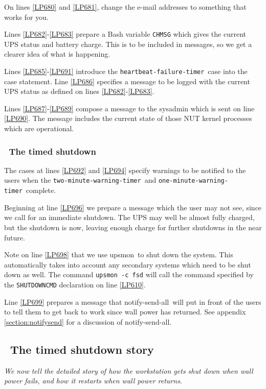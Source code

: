 \documentclass[12pt]{article}
\newlength{\headersep}\setlength{\headersep}{3mm}
\newcommand{\Hsep}{\hspace{\headersep}}
\newcommand{\newcolumn}{\vfill\eject}
\newcommand{\upsmon}{\mbox{\textcolor{MONCOLOUR}{upsmon}}}
\newcommand{\notifysendall}{\mbox{\textcolor{NOTIFYCOLOUR}{notify-send-all}}}
\newcommand{\twominwarntim}{\texttt{two-minute{\allowbreak}-warning{\allowbreak}-timer}}
\newcommand{\oneminwarntim}{\texttt{one-minute{\allowbreak}-warning{\allowbreak}-timer}}
\newcommand{\heartfailtimer}{\texttt{heartbeat{\allowbreak}-failure{\allowbreak}-timer}}
\begin{document}
On lines \ref{LP680} and \ref{LP681}, change the e-mail addresses to something
that works for you.

Lines \ref{LP682}-\ref{LP683} prepare a Bash variable \texttt{CHMSG} which
gives the current UPS status and battery charge.  This is to be included in
messages, so we get a clearer idea of what is happening.

Lines \ref{LP685}-\ref{LP691} introduce the \heartfailtimer\
case into the case statement.  Line \ref{LP686} specifies a message to be
logged with the current UPS status as defined on lines
\ref{LP682}-\ref{LP683}.  

Lines \ref{LP687}-\ref{LP689} compose a message to the sysadmin which is sent
on line \ref{LP690}.  The message includes the current state of those NUT
kernel processes which are operational.

\subsubsection{\Hsep\ The timed shutdown}\label{section:timedshutdown}

The cases at lines \ref{LP692} and \ref{LP694} specify warnings to be notified
to the users when the \twominwarntim\ and \oneminwarntim\ complete.

Beginning at line \ref{LP696} we prepare a message which the user may not see,
since we call for an immediate shutdown.  The UPS may well be almost fully
charged, but the shutdown is now, leaving enough charge for further shutdowns
in the near future.  

Note on line \ref{LP698} that we use \upsmon\ to shut down the system.
This automatically takes into account any secondary systems which need to
be shut down as well. The command \texttt{upsmon -c fsd} will call the
command specified by the \texttt{SHUTDOWNCMD} declaration on line
\ref{LP610}.

Line \ref{LP699} prepares a message that \notifysendall\ will put in front of
the users to tell them to get back to work since wall power has returned.  See
appendix \ref{section:notifysend} for a discussion of \notifysendall.

\newcolumn
\subsection{\Hsep\ The timed shutdown story}\label{section:story:timed}

\textsl{We now tell the detailed story of how the workstation gets
  shut down when wall power fails, and how it restarts when wall power
  returns.}
\end{document}
